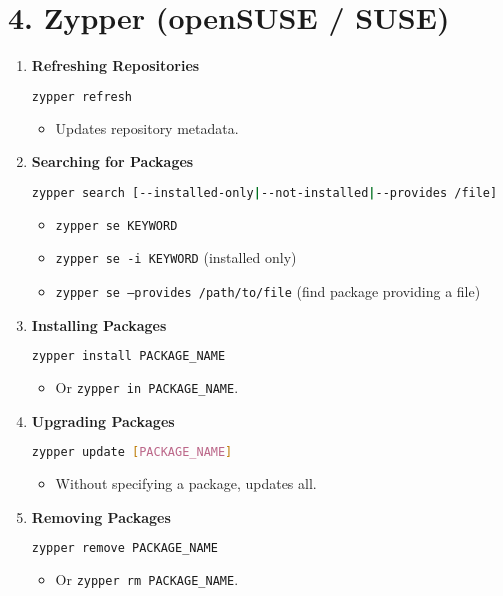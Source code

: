\documentclass[a4paper]{report}
\begin{document}
\section*{4. Zypper (openSUSE / SUSE)}

\begin{enumerate}
    \item \textbf{Refreshing Repositories}
    \begin{lstlisting}[language=bash]
zypper refresh
    \end{lstlisting}
    \begin{itemize}
        \item Updates repository metadata.
    \end{itemize}

    \item \textbf{Searching for Packages}
    \begin{lstlisting}[language=bash]
zypper search [--installed-only|--not-installed|--provides /file]
    \end{lstlisting}
    \begin{itemize}
        \item \texttt{zypper se KEYWORD}
        \item \texttt{zypper se -i KEYWORD} (installed only)
        \item \texttt{zypper se --provides /path/to/file} (find package providing a file)
    \end{itemize}

    \item \textbf{Installing Packages}
    \begin{lstlisting}[language=bash]
zypper install PACKAGE_NAME
    \end{lstlisting}
    \begin{itemize}
        \item Or \texttt{zypper in PACKAGE\_NAME}.
    \end{itemize}

    \item \textbf{Upgrading Packages}
    \begin{lstlisting}[language=bash]
zypper update [PACKAGE_NAME]
    \end{lstlisting}
    \begin{itemize}
        \item Without specifying a package, updates all.
    \end{itemize}

    \item \textbf{Removing Packages}
    \begin{lstlisting}[language=bash]
zypper remove PACKAGE_NAME
    \end{lstlisting}
    \begin{itemize}
        \item Or \texttt{zypper rm PACKAGE\_NAME}.
    \end{itemize}


\end{enumerate}
\end{document}
